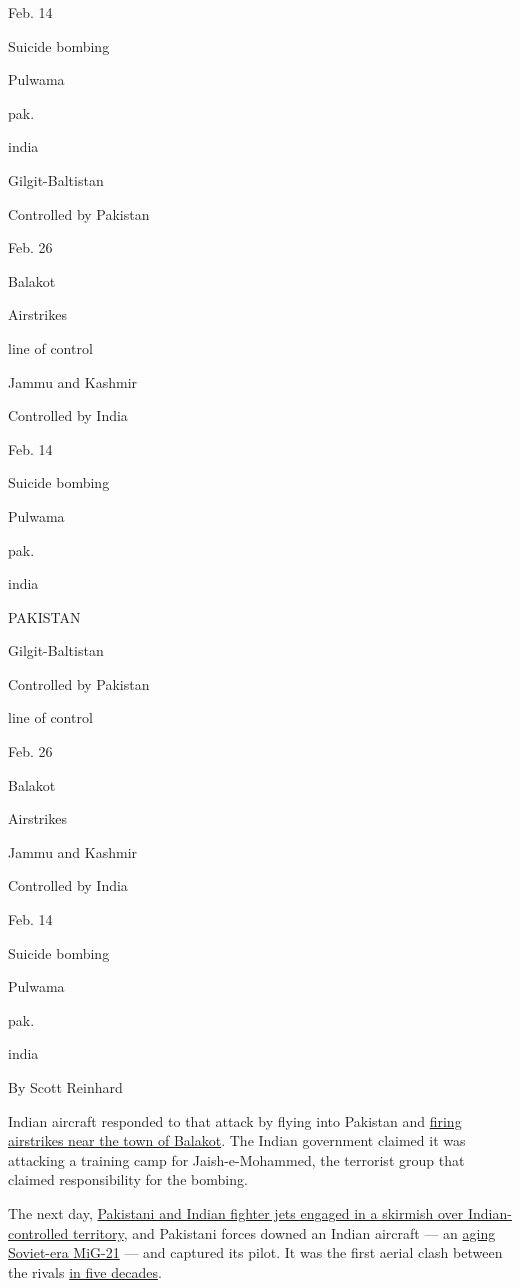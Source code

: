 Feb. 14

Suicide bombing

Pulwama

pak.

india

Gilgit-Baltistan

Controlled by Pakistan

Feb. 26

Balakot

Airstrikes

line of control

Jammu and Kashmir

Controlled by India

Feb. 14

Suicide bombing

Pulwama

pak.

india

PAKISTAN

Gilgit-Baltistan

Controlled by Pakistan

line of control

Feb. 26

Balakot

Airstrikes

Jammu and Kashmir

Controlled by India

Feb. 14

Suicide bombing

Pulwama

pak.

india

By Scott Reinhard

Indian aircraft responded to that attack by flying into Pakistan and
\href{https://www.nytimes.com/2019/02/26/world/asia/india-pakistan-kashmir-airstrikes.html}{firing
airstrikes near the town of Balakot}. The Indian government claimed it
was attacking a training camp for Jaish-e-Mohammed, the terrorist group
that claimed responsibility for the bombing.

The next day,
\href{https://www.nytimes.com/2019/02/27/world/asia/kashmir-india-pakistan-aircraft.html}{Pakistani
and Indian fighter jets engaged in a skirmish over Indian-controlled
territory}, and Pakistani forces downed an Indian aircraft --- an
\href{https://www.nytimes.com/2019/03/03/world/asia/india-military-united-states-china.html}{aging
Soviet-era MiG-21} --- and captured its pilot. It was the first aerial
clash between the rivals
\href{https://www.nytimes.com/2019/03/03/world/asia/india-military-united-states-china.html?module=inline}{in
five decades}.

